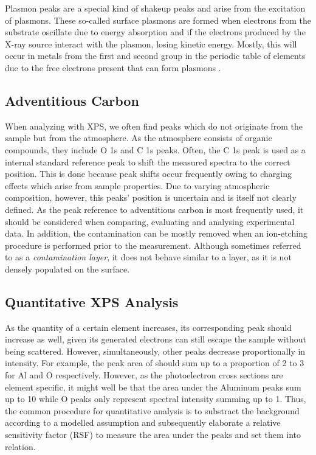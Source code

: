 Plasmon peaks are a special kind of shakeup peaks and arise from the excitation of plasmons. These so-called surface plasmons are formed when electrons from the substrate oscillate due to energy absorption and if the electrons produced by the X-ray source interact with the plasmon, losing kinetic energy. Mostly, this will occur in metals from the first and second group in the periodic table of elements due to the free electrons present that can form plasmons \cite{moulder_handbook_1992}.



\subsection{Adventitious Carbon}
    
When analyzing with XPS, we often find peaks which do not originate from the sample but from the atmosphere. As the atmosphere consists of organic compounds, they include O 1s and C 1s peaks. Often, the C 1s peak is used as a internal standard reference peak to shift the measured spectra to the correct position. This is done because peak shifts occur frequently owing to charging effects which arise from sample properties. Due to varying atmospheric composition, however, this peaks' position is uncertain and is itself  not clearly defined. \cite{biesinger_accessing_2022} As the peak reference to adventitious carbon is most frequently used, it should be considered when comparing, evaluating and analysing experimental data.
In addition, the contamination can be mostly removed when an ion-etching procedure is performed prior to the measurement. Although sometimes referred to as a \emph{contamination layer}, it does not behave similar to a layer, as it is not densely populated on the surface.

\subsection{Quantitative XPS Analysis}
As the quantity of a certain element increases, its corresponding peak should increase as well, given its generated electrons can still escape the sample without being scattered. However, simultaneously, other peaks decrease proportionally in intensity. For example, the peak area of  should sum up to a proportion of 2 to 3 for Al and O respectively.
However, as the photoelectron cross sections are element specific, it might well be that the area under the Aluminum peaks sum up to 10 while O peaks only represent spectral intensity summing up to 1. Thus, the common procedure for quantitative analysis is to substract the background according to a modelled assumption and subsequently elaborate a relative sensitivity factor (RSF) to measure the area under the peaks and set them into relation.

